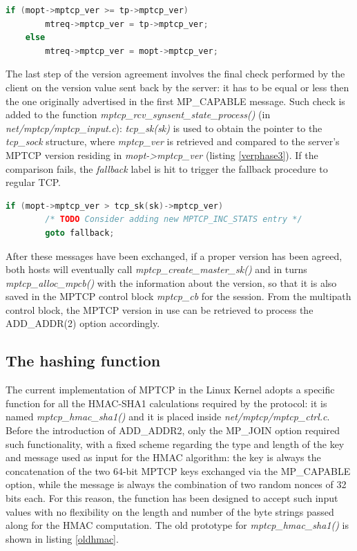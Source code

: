 \begin{lstlisting}[language=c, caption=MPTCP version agreement (phase 2), label=verphase2]
	if (mopt->mptcp_ver >= tp->mptcp_ver)
		mtreq->mptcp_ver = tp->mptcp_ver;
	else
		mtreq->mptcp_ver = mopt->mptcp_ver;
\end{lstlisting}

The last step of the version agreement involves the final check performed by the client on the version value sent back by the server: it has to be equal or less then the one originally advertised in the first MP\_CAPABLE message. Such check is added to the function \textit{mptcp\_rcv\_synsent\_state\_process()} (in \textit{net/mptcp/mptcp\_input.c}): \textit{tcp\_sk(sk)} is used to obtain the pointer to the \textit{tcp\_sock} structure, where \textit{mptcp\_ver} is retrieved and compared to the server's MPTCP version residing in \textit{mopt->mptcp\_ver} (listing \ref{verphase3}). If the comparison fails, the \textit{fallback} label is hit to trigger the fallback procedure to regular TCP.

\begin{lstlisting}[language=c, caption=MPTCP version agreement (phase 3), label=verphase3]
	if (mopt->mptcp_ver > tcp_sk(sk)->mptcp_ver)
		/* TODO Consider adding new MPTCP_INC_STATS entry */
		goto fallback;
\end{lstlisting}

After these messages have been exchanged, if a proper version has been agreed, both hosts will eventually call \textit{mptcp\_create\_master\_sk()} and in turns \textit{mptcp\_alloc\_mpcb()} with the information about the version, so that it is also saved in the MPTCP control block \textit{mptcp\_cb} for the session. From the multipath control block, the MPTCP version in use can be retrieved to process the ADD\_ADDR(2) option accordingly.

\subsection{The hashing function}
\label{newhash}
The current implementation of MPTCP in the Linux Kernel adopts a specific function for all the HMAC-SHA1 calculations required by the protocol: it is named \textit{mptcp\_hmac\_sha1()} and it is placed inside \textit{net/mptcp/mptcp\_ctrl.c}. Before the introduction of ADD\_ADDR2, only the MP\_JOIN option required such functionality, with a fixed scheme regarding the type and length of the key and message used as input for the HMAC algorithm: the key is always the concatenation of the two 64-bit MPTCP keys exchanged via the MP\_CAPABLE option, while the message is always the combination of two random nonces of 32 bits each. For this reason, the function has been designed to accept such input values with no flexibility on the length and number of the byte strings passed along for the HMAC computation. The old prototype for \textit{mptcp\_hmac\_sha1()} is shown in listing \ref{oldhmac}.

